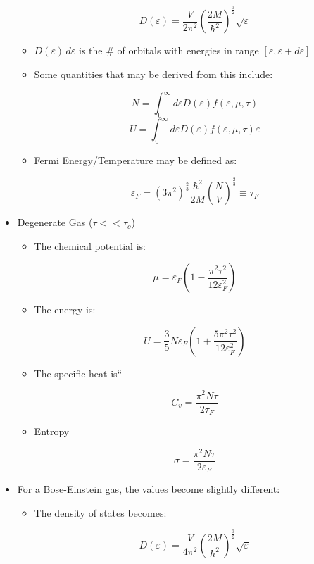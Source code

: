 \begin{itemize}
\begin{itemize}
        $$D(\varepsilon)=\frac{V}{2\pi^2}\left( \frac{2M}{\hbar^2} \right)^{\frac{3}{2}}\sqrt{\varepsilon}$$

      \item $D(\varepsilon)\,d\varepsilon$ is the \# of orbitals with energies in range $[\varepsilon,\varepsilon+d\varepsilon]$

      \item Some quantities that may be derived from this include:

        $$N=\int_0^\infty d\varepsilon D(\varepsilon)f(\varepsilon,\mu,\tau)$$
        $$U=\int_0^\infty d\varepsilon D(\varepsilon)f(\varepsilon,\mu,\tau)\varepsilon$$

      \item Fermi Energy/Temperature may be defined as:

        $$\varepsilon_F=\left( 3\pi^2 \right)^{\frac{2}{3}}\frac{\hbar^2}{2M}\left( \frac{N}{V} \right)^{\frac{2}{3}}\equiv\tau_F$$

    \end{itemize}

  \item Degenerate Gas ($\tau << \tau_o$)

    \begin{itemize}

      \item The chemical potential is:

        $$\mu=\varepsilon_F\left( 1-\frac{\pi^2\tau^2}{12\varepsilon_F^2} \right)$$

      \item The energy is:

        $$U=\frac{3}{5}N\varepsilon_F\left( 1+\frac{5\pi^2\tau^2}{12\varepsilon_F^2} \right)$$

      \item The specific heat is``

        $$C_v=\frac{\pi^2N\tau}{2\tau_F}$$

      \item Entropy

        $$\sigma=\frac{\pi^2N\tau}{2\varepsilon_F}$$

    \end{itemize}

  \item For a Bose-Einstein gas, the values become slightly different:

    \begin{itemize}

      \item The density of states becomes:

        $$D(\varepsilon)=\frac{V}{4\pi^2}\left( \frac{2M}{\hbar^2} \right)^{\frac{3}{2}}\sqrt{\varepsilon}$$

    \end{itemize}

\end{itemize}





